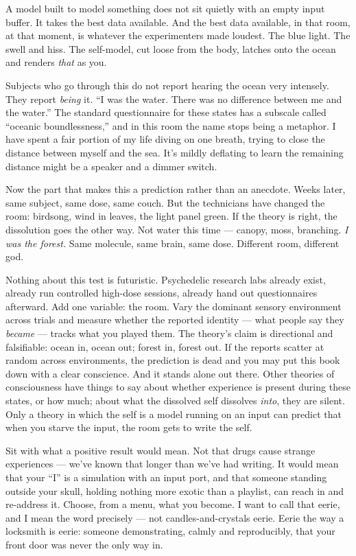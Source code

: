 \documentclass[11pt, twoside, openright]{book}
\begin{document}
A model built to model something does not sit quietly with an empty input buffer. It takes the best data available. And the best data available, in that room, at that moment, is whatever the experimenters made loudest. The blue light. The swell and hiss. The self-model, cut loose from the body, latches onto the ocean and renders \textit{that} as you.

Subjects who go through this do not report hearing the ocean very intensely. They report \textit{being} it. ``I was the water. There was no difference between me and the water.'' The standard questionnaire for these states has a subscale called ``oceanic boundlessness,'' and in this room the name stops being a metaphor. I have spent a fair portion of my life diving on one breath, trying to close the distance between myself and the sea. It's mildly deflating to learn the remaining distance might be a speaker and a dimmer switch.

Now the part that makes this a prediction rather than an anecdote. Weeks later, same subject, same dose, same couch. But the technicians have changed the room: birdsong, wind in leaves, the light panel green. If the theory is right, the dissolution goes the other way. Not water this time --- canopy, moss, branching. \textit{I was the forest.} Same molecule, same brain, same dose. Different room, different god.

Nothing about this test is futuristic. Psychedelic research labs already exist, already run controlled high-dose sessions, already hand out questionnaires afterward. Add one variable: the room. Vary the dominant sensory environment across trials and measure whether the reported identity --- what people say they \textit{became} --- tracks what you played them. The theory's claim is directional and falsifiable: ocean in, ocean out; forest in, forest out. If the reports scatter at random across environments, the prediction is dead and you may put this book down with a clear conscience. And it stands alone out there. Other theories of consciousness have things to say about whether experience is present during these states, or how much; about what the dissolved self dissolves \textit{into}, they are silent. Only a theory in which the self is a model running on an input can predict that when you starve the input, the room gets to write the self.

Sit with what a positive result would mean. Not that drugs cause strange experiences --- we've known that longer than we've had writing. It would mean that your ``I'' is a simulation with an input port, and that someone standing outside your skull, holding nothing more exotic than a playlist, can reach in and re-address it. Choose, from a menu, what you become. I want to call that eerie, and I mean the word precisely --- not candles-and-crystals eerie. Eerie the way a locksmith is eerie: someone demonstrating, calmly and reproducibly, that your front door was never the only way in.
\end{document}
